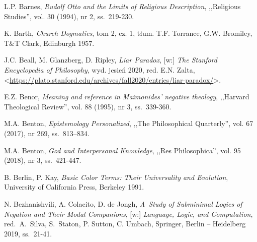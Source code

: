 \begin{thebibliography}{100}
L.P. Barnes, \textit{Rudolf Otto and the Limits of Religious Description}, ,,Religious Studies'', vol. 30 (1994), nr 2, ss.~219-230.


K. Barth, \textit{Church Dogmatics}, tom 2, cz. 1, tłum. T.F. Torrance, G.W. Bromiley, T\&T Clark, Edinburgh 1957.

J.C. Beall, M. Glanzberg, D. Ripley, \textit{Liar Paradox}, [w:] \textit{The Stanford Encyclopedia of Philosophy},
wyd. jesień 2020, red. E.N. Zalta, {\textless}\url{https://plato.stanford.edu/archives/fall2020/entries/liar-paradox/}{\textgreater}.


E.Z. Benor, \textit{Meaning and reference in Maimonides' negative theology}, ,,Harvard Theological Review'', vol. 88 (1995), nr 3, ss.~339-360.

M.A. Benton, \textit{Epistemology Personalized}, ,,The Philosophical Quarterly'', vol. 67 (2017), nr 269, ss.~813–834.

M.A. Benton, \textit{God and Interpersonal Knowledge}, ,,Res Philosophica'', vol. 95 (2018), nr 3, ss.~421-447.


B. Berlin, P. Kay, \textit{Basic Color Terms: Their Universality and Evolution}, University of California Press, Berkeley 1991.

N. Bezhanishvili, A. Colacito, D. de Jongh, \textit{A~Study of Subminimal Logics of Negation and Their Modal Companions},
[w:] \textit{Language, Logic, and Computation}, red.~A.~Silva, S.~Staton, P. Sutton, C. Umbach, Springer, Berlin -- Heidelberg 2019, ss.~21-41.


\end{thebibliography}
